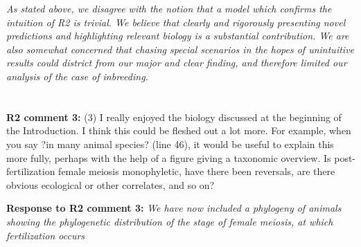 \documentclass[12pt,letterpaper]{article}
\newcommand{\gc}[1]{{ \color{red} #1}}
\begin{document}
\emph{As stated above, we disagree with the notion that a model which confirms the intuition of R2 is trivial. We believe that clearly and rigorously presenting novel predictions and highlighting relevant biology is a substantial contribution. We are also somewhat concerned that chasing special scenarios in the hopes of unintuitive results could district from our major and clear finding, and therefore limited our analysis of the case of inbreeding.}
\\
\\
\\
{\bf{R2 comment 3:}}  (3) I really enjoyed the biology discussed at the beginning of the Introduction. I think this could be fleshed out a lot more. For example, when you say ?in many animal species? (line 46), it would be useful to explain this more fully, perhaps with the help of a figure giving a taxonomic overview. Is post-fertilization female meiosis monophyletic, have there been reversals, are there obvious ecological or other correlates, and so on?

{\bf{Response to R2 comment 3:}}  \emph{\gc{We have now included a phylogeny of animals showing the phylogenetic distribution of the stage of female meiosis, at which fertilization occurs}}
\\
\end{document}

